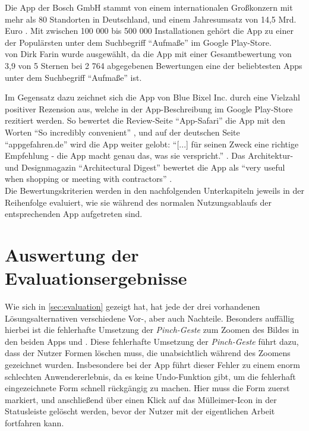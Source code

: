\noindent
Die App \mm{} der Bosch GmbH stammt von einem internationalen Großkonzern mit mehr als 80 Standorten in Deutschland, und einem Jahresumsatz von 14,5 Mrd. Euro \citep{Bosch18}.
Mit zwischen 100 000 bis 500 000 Installationen gehört die App zu einer der Populärsten unter dem Suchbegriff ``Aufmaße'' im Google Play-Store. \\

\im{} von Dirk Farin wurde ausgewählt, da die App mit einer Gesamtbewertung von 3,9 von 5 Sternen bei 2 764 abgegebenen Bewertungen eine der beliebtesten Apps unter dem Suchbegriff ``Aufmaße'' ist.

Im Gegensatz dazu zeichnet sich die App \pm{} von Blue Bixel Inc. durch eine Vielzahl positiver Rezension aus, welche in der App-Beschreibung im Google Play-Store rezitiert werden.
So bewertet die Review-Seite ``App-Safari'' die App mit den Worten ``So incredibly convenient'' \citep{AppSafari18}, und auf der deutschen Seite ``appgefahren.de'' wird die App weiter gelobt:
``[...] für seinen Zweck eine richtige Empfehlung - die App macht genau das, was sie verspricht.'' \citep{Appgefahren18}.
Das Architektur- und Designmagazin ``Architectural Digest'' bewertet die App als ``very useful when shopping or meeting with contractors'' \citep{Architect18}. \\

Die Bewertungskriterien werden in den nachfolgenden Unterkapiteln jeweils in der Reihenfolge evaluiert, wie sie während des normalen Nutzungsablaufs der entsprechenden App aufgetreten sind.




\section{Auswertung der Evaluationsergebnisse}


Wie sich in \autoref{sec:evaluation} gezeigt hat, hat jede der drei vorhandenen Lösungsalternativen verschiedene Vor-, aber auch Nachteile.
Besonders auffällig hierbei ist die fehlerhafte Umsetzung der \emph{Pinch-Geste} zum Zoomen des Bildes in den beiden Apps \mm{} und \pm{}.
Diese fehlerhafte Umsetzung der \emph{Pinch-Geste} führt dazu, dass der Nutzer Formen löschen muss, die unabsichtlich während des Zoomens gezeichnet wurden.
Insbesondere bei der App \pm{} führt dieser Fehler zu einem enorm schlechten Anwendererlebnis, da es keine Undo-Funktion gibt, um die fehlerhaft eingezeichnete Form schnell rückgängig zu machen.
Hier muss die Form zuerst markiert, und anschließend über einen Klick auf das Mülleimer-Icon in der Statusleiste gelöscht werden, bevor der Nutzer mit der eigentlichen Arbeit fortfahren kann. \\

